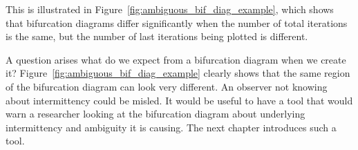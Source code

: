 This is illustrated in Figure~\ref{fig:ambiguous_bif_diag_example}, which shows that bifurcation diagrams differ significantly when the number of total iterations is the same, but the number of last iterations being plotted is different.
\par
A question arises what do we expect from a bifurcation diagram when we create it?
 Figure~\ref{fig:ambiguous_bif_diag_example} clearly shows that the same region of the bifurcation diagram can look very different.
An observer not knowing about intermittency could be misled.
It would be useful to have a tool that would warn a researcher looking at the bifurcation diagram about underlying intermittency and ambiguity it is causing.
The next chapter introduces such a tool.

\endinput